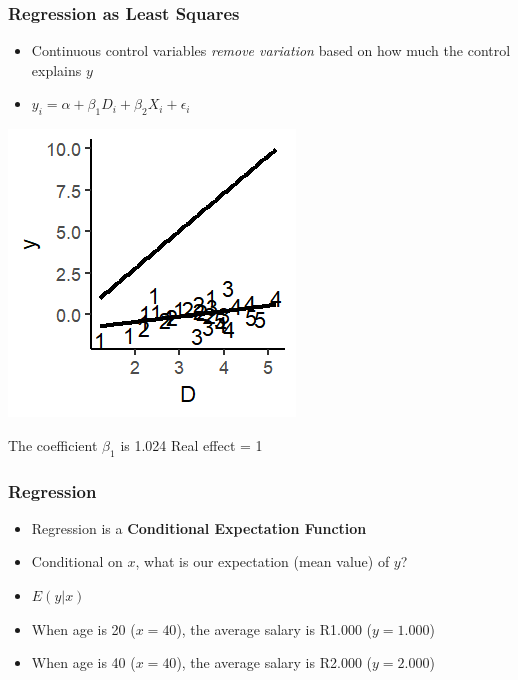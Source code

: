 \documentclass[xcolor=x11names,compress]{beamer}\usepackage[]{graphicx}\usepackage[]{color}
\makeatletter
\def\maxwidth{ %
  \ifdim\Gin@nat@width>\linewidth
    \linewidth
  \else
    \Gin@nat@width
  \fi
}
\newenvironment{knitrout}{}{} %
\renewcommand{\(}{\begin{columns}}
\renewcommand{\)}{\end{columns}}
\newcommand{\<}[1]{\begin{column}{#1}}
\renewcommand{\>}{\end{column}}
\makeatother
\begin{document}
\begin{frame}
\frametitle{Regression as Least Squares}
\begin{itemize}
\item Continuous control variables \textit{remove variation} based on how much the control explains $y$
\item $y_i = \alpha + \beta_1 D_i + \beta_2 X_i + \epsilon_i$
\end{itemize}
\begin{multicols}{2}
\begin{knitrout}
\color{fgcolor}
\includegraphics[width=\maxwidth]{figure/graph_ols_control3-1} 

\end{knitrout}
\columnbreak

The coefficient $\beta_1$ is 1.024
Real effect = 1
\end{multicols}
\end{frame}

\begin{frame}
\frametitle{Regression}
\begin{itemize}
\item Regression is a \textbf{Conditional Expectation Function}
\pause
\item Conditional on $x$, what is our expectation (mean value) of $y$?
\pause
\item $E(y|x)$
\pause
\item When age is 20 ($x=40$), the average salary is R1.000 ($y=1.000$)
\item When age is 40 ($x=40$), the average salary is R2.000 ($y=2.000$)
\end{itemize}
\end{frame}
\end{document}
